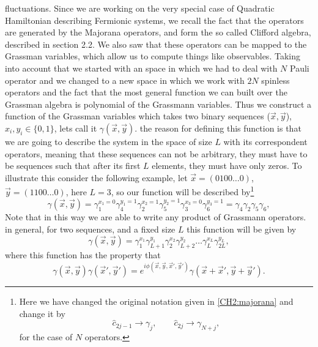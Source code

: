 fluctuations. Since we are working on the very special case of Quadratic Hamiltonian describing Fermionic systems, we recall the fact that the operators are generated by the Majorana operators, and form the so called Clifford algebra, described in section 2.2. We also saw that these operators can be mapped to the Grassman variables, which allow us to compute things like observables. Taking into account that we started with an space in which we had to deal with $N$ Pauli operator and we changed to a new space in which we work with $2N$ spinless operators and the fact that the most general  function we can built over the Grassman algebra is polynomial of the Grassmann variables. Thus we construct a function of the Grassman variables which takes two binary sequences ($\vec{x},\vec{y}$), $x_i,y_i \in \{0,1\}$, lets call it $\gamma(\vec{x},\vec{y})$. the reason for defining this function is that we are going to describe the system in the space of size $L$ with its correspondent operators, meaning that these sequences can not be arbitrary, they must have to be sequences such that after its first $L$ elements, they must have only zeros. To illustrate this consider the following example, let $\vec{x}=(0100\ldots 0)$, $\vec{y}=(1100\ldots 0)$, here $L=3$, so our function will be described by\footnote{Here we have changed the original notation given in \eqref{CH2:majorana} and change it by 
\begin{equation}
\hat{c}_{2j-1}\rightarrow \gamma_{j} , \qquad \hat{c}_{2j}\rightarrow \gamma_{N+j},
\end{equation}
for the case of $N$ operators.
}
\begin{equation}
\gamma(\vec{x},\vec{y}) = \gamma_1^{x_1=0} \gamma_{4}^{y_1=1} \gamma_{2}^{x_2=1} \gamma_{5}^{y_2=1} \gamma_{3}^{x_3=0} \gamma_{6}^{y_3=1} = \gamma_{4}\gamma_{2}\gamma_{5}\gamma_{6},
\end{equation}
Note that in this way we are able to write any product of Grassmann operators. in general, for two sequences, and a fixed size $L$ this function will be given by
\begin{equation}
\gamma(\vec{x},\vec{y}) = \gamma_1^{x_1} \gamma_{L+1}^{y_1} \gamma_{2}^{x_2} \gamma_{L+2}^{y_2}\ldots \gamma_{L}^{x_L} \gamma_{2L}^{y_L},
\end{equation} 
where this function has the property that
\begin{equation}
\gamma(\vec{x},\vec{y})\gamma(\vec{x}',\vec{y}') = e^{i\phi(\vec{x},\vec{y},\vec{x}',\vec{y}')} \gamma(\vec{x}+\vec{x}',\vec{y}+\vec{y}').
\label{CH2:my_relation_delta}
\end{equation}
